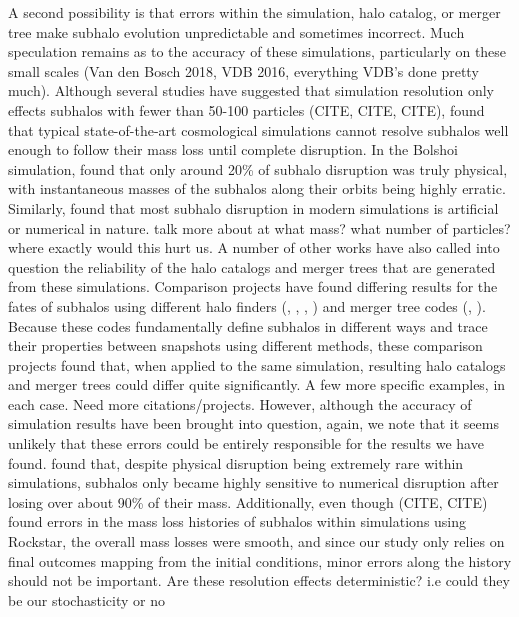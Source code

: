 \documentclass[fleqn,usenatbib]{mnras}
\newcommand\edits[1]{{\color{red}#1}}
\begin{document}
{A second possibility is that errors within the simulation, halo catalog, or merger tree make subhalo evolution unpredictable and sometimes incorrect. Much speculation remains as to the accuracy of these simulations, particularly on these small scales (Van den Bosch 2018, VDB 2016, everything VDB's done pretty much). Although several studies have suggested that simulation resolution only effects subhalos with fewer than 50-100 particles (CITE, CITE, CITE), \citet{VandenBosch2018} found that typical state-of-the-art cosmological simulations cannot resolve subhalos well enough to follow their mass loss until complete disruption. In the Bolshoi simulation, \citet{VDB2016} found that only around 20\% of subhalo disruption was truly physical, with instantaneous masses of the subhalos along their orbits being highly erratic. Similarly, \citet{VandenBosch2017} found that most subhalo disruption in modern simulations is artificial or numerical in nature. \edits{talk more about at what mass? what number of particles? where exactly would this hurt us.} A number of other works have also called into question the reliability of the halo catalogs and merger trees that are generated from these simulations. Comparison projects have found differing results for the fates of subhalos using different halo finders (\citet{Knebe2011}, \citet{Onions2012}, \citet{Avila2014}, \citet{Behroozi2015}) and merger tree codes (\citet{Srisawat2013}, \citet{Jiang2014}). Because these codes fundamentally define subhalos in different ways and trace their properties between snapshots using different methods, these comparison projects found that, when applied to the same simulation, resulting halo catalogs and merger trees could differ quite significantly. \edits{A few more specific examples, in each case. Need more citations/projects.}
However, although the accuracy of simulation results have been brought into question, again, we note that it seems unlikely that these errors could be entirely responsible for the results we have found. \citet{VandenBosch2018} found that, despite physical disruption being extremely rare within simulations, subhalos only became highly sensitive to numerical disruption after losing over about 90\% of their mass. Additionally, even though (CITE, CITE) found errors in the mass loss histories of subhalos within simulations using Rockstar, the overall mass losses were smooth, and since our study only relies on final outcomes mapping from the initial conditions, minor errors along the history should not be important. \edits{Are these resolution effects deterministic? i.e could they be our stochasticity or no}

}
\end{document}
